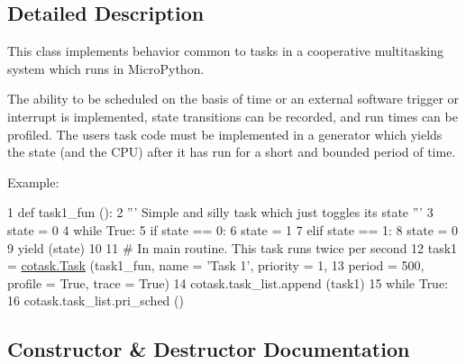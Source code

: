 \subsection{Detailed Description}
This class implements behavior common to tasks in a cooperative multitasking system which runs in Micro\+Python. 

The ability to be scheduled on the basis of time or an external software trigger or interrupt is implemented, state transitions can be recorded, and run times can be profiled. The user\textquotesingle{}s task code must be implemented in a generator which yields the state (and the C\+PU) after it has run for a short and bounded period of time.

Example\+: 
\begin{DoxyCode}
1 \textcolor{keyword}{def }task1\_fun ():
2     \textcolor{stringliteral}{''' Simple and silly task which just toggles its state '''}
3     state = 0
4     \textcolor{keywordflow}{while} \textcolor{keyword}{True}:
5         \textcolor{keywordflow}{if} state == 0:
6             state = 1
7         \textcolor{keywordflow}{elif} state == 1:
8             state = 0
9         \textcolor{keywordflow}{yield} (state)
10 
11 \textcolor{comment}{# In main routine. This task runs twice per second}
12 task1 = \hyperlink{classcotask_1_1Task}{cotask.Task} (task1\_fun, name = \textcolor{stringliteral}{'Task 1'}, priority = 1, 
13                      period = 500, profile = \textcolor{keyword}{True}, trace = \textcolor{keyword}{True})
14 cotask.task\_list.append (task1)
15 \textcolor{keywordflow}{while} \textcolor{keyword}{True}: 
16     cotask.task\_list.pri\_sched ()
\end{DoxyCode}
 

\subsection{Constructor \& Destructor Documentation}

